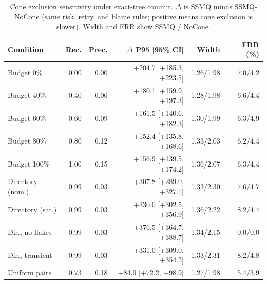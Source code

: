 \begin{table}[t]\centering\scriptsize
\caption{Cone exclusion sensitivity under exact-tree commit. $\Delta$ is SSMQ minus SSMQ-NoCone (same risk, retry, and blame rules; positive means cone exclusion is slower). Width and FRR show SSMQ / NoCone.}\label{tab:v7control}
\setlength{\tabcolsep}{0.8pt}
\begin{tabular}{lrrrrr}\toprule
Condition & Rec. & Prec. & $\Delta$ P95 [95\% CI] & Width & FRR (\%) \\ \midrule
Budget 0\% & 0.00 & 0.00 & +204.7 [+185.3, +223.5] & 1.26/1.98 & 7.0/4.2 \\
Budget 40\% & 0.40 & 0.06 & +180.1 [+159.9, +197.3] & 1.28/1.98 & 6.6/4.4 \\
Budget 60\% & 0.60 & 0.09 & +161.5 [+140.6, +182.3] & 1.30/1.99 & 6.3/4.9 \\
Budget 80\% & 0.80 & 0.12 & +152.4 [+135.8, +168.6] & 1.33/2.03 & 6.2/4.4 \\
Budget 100\% & 1.00 & 0.15 & +156.9 [+139.5, +174.2] & 1.36/2.07 & 6.3/4.4 \\
Directory (nom.) & 0.99 & 0.03 & +307.8 [+289.0, +327.1] & 1.33/2.30 & 7.6/4.7 \\
Directory (sat.) & 0.99 & 0.03 & +330.0 [+302.5, +356.9] & 1.36/2.22 & 8.2/4.4 \\
Dir., no flakes & 0.99 & 0.03 & +376.5 [+364.7, +388.7] & 1.34/2.15 & 0.0/0.0 \\
Dir., transient & 0.99 & 0.03 & +331.0 [+309.0, +354.2] & 1.33/2.31 & 8.2/4.8 \\
Uniform pairs & 0.73 & 0.18 & +84.9 [+72.2, +98.9] & 1.27/1.98 & 5.4/3.9 \\
\bottomrule\end{tabular}\end{table}
